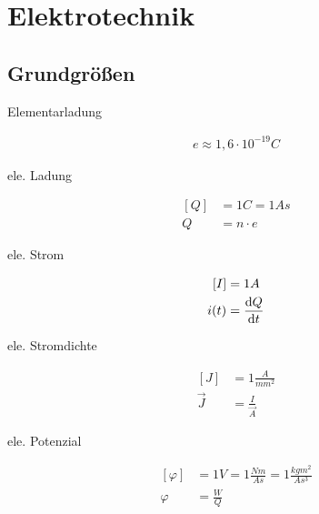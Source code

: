 \chapter{Elektrotechnik}
\section{Grundgrößen}

\begin{boxleft}Elementarladung
\end{boxleft}\begin{boxrightshaded}
\begin{align}
e\approx 1,6\cdot 10^{-19}C
\end{align}
\end{boxrightshaded}

\begin{boxleft}ele. Ladung
\end{boxleft}\begin{boxrightshaded}
\begin{align}
\left[Q\right]&=1C=1As\\
Q&=n\cdot e
\end{align}
\end{boxrightshaded}

\begin{boxleft}ele. Strom
\end{boxleft}\begin{boxrightshaded}
\begin{align}
\left[I\right]&=1A\\
i(t)&=\frac{\mathop{}\!\mathrm{d} Q}{\mathop{}\!\mathrm{d} t}
\end{align}
\end{boxrightshaded}

\begin{boxleft}ele. Stromdichte
\end{boxleft}\begin{boxrightshaded}
\begin{align}
\left[J\right]&=1\frac{A}{mm^2}\\
\vec{J}&=\frac{I}{\vec{A}}
\end{align}
\end{boxrightshaded}

\begin{boxleft}ele. Potenzial
\end{boxleft}\begin{boxrightshaded}
\begin{align}
\left[\varphi\right]&=1V=1\frac{Nm}{As}=1\frac{kgm^2}{As^3}\\
\varphi&=\frac{W}{Q}
\end{align}
\end{boxrightshaded}

